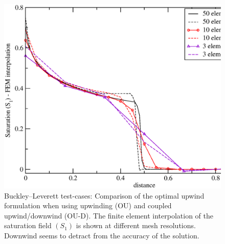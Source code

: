 \begin{figure}[h]
\begin{center}
\includegraphics[width=1.\textwidth]{diagrams/bl-upwind-v-up-and-down.eps}
\end{center}
\caption{Buckley--Leverett test-cases: Comparison of the optimal upwind formulation when using upwinding (OU) and coupled upwind/downwind (OU-D). The finite element interpolation of the saturation field $\left(S_{1}\right)$ is shown at different mesh resolutions. Downwind seems to detract from the accuracy of the solution. \label{bl-upwind-v-up-and-down}}
\end{figure}

